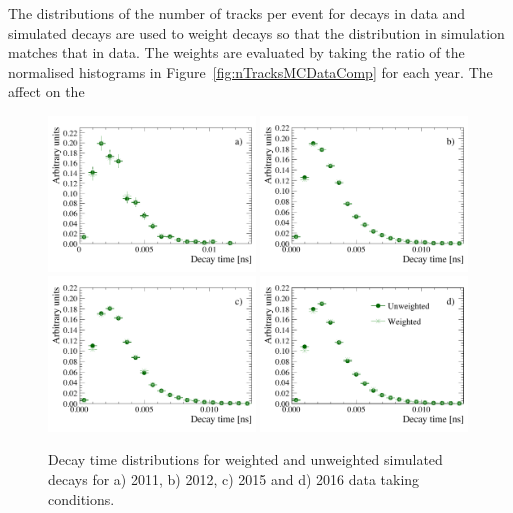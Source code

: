 The distributions of the number of tracks per event for \bdkpi decays in data and simulated decays are used to weight \bdkpi decays so that the distribution in simulation matches that in data. The weights are evaluated by taking the ratio of the normalised histograms in Figure~\ref{fig:nTracksMCDataComp} for each year. The affect on the 

\clearpage 
\begin{figure}[h]%
  \centering
    \includegraphics[width=0.49\textwidth]{./Figs/LifetimeMeasurement/2011_decaytime_Bd2KPi_weighting_impact.pdf}
    \includegraphics[width=0.49\textwidth]{./Figs/LifetimeMeasurement/2012_decaytime_Bd2KPi_weighting_impact.pdf}
    \includegraphics[width=0.49\textwidth]{./Figs/LifetimeMeasurement/2015_decaytime_Bd2KPi_weighting_impact.pdf}
    \includegraphics[width=0.49\textwidth]{./Figs/LifetimeMeasurement/2016_decaytime_Bd2KPi_weighting_impact.pdf}
  \caption{Decay time distributions for weighted and unweighted \bdkpi simulated decays for a) 2011, b) 2012, c) 2015 and d) 2016  data taking conditions.}%
  \label{fig:BdToKpi_weightDecayTime}
\end{figure}

